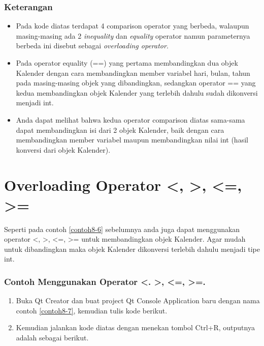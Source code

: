 \subsubsection*{Keterangan}

\begin{itemize}

\item
  Pada kode diatas terdapat 4 comparison operator yang berbeda, walaupun
  masing-masing ada 2 \emph{inequality} dan \emph{equality} operator
  namun parameternya berbeda ini disebut sebagai \emph{overloading
  operator}.
\item
  Pada operator equality (==) yang pertama membandingkan dua objek
  Kalender dengan cara membandingkan member variabel hari, bulan, tahun
  pada masing-masing objek yang dibandingkan, sedangkan operator == yang
  kedua membandingkan objek Kalender yang terlebih dahulu sudah
  dikonversi menjadi int.
\item
  Anda dapat melihat bahwa kedua operator comparison diatas sama-sama
  dapat membandingkan isi dari 2 objek Kalender, baik dengan cara
  membandingkan member variabel maupun membandingkan nilai int (hasil
  konversi dari objek Kalender).
\end{itemize}

\section{Overloading Operator \textless{}, \textgreater{}, \textless{}=, \textgreater{}=}\label{overloading-operator}

Seperti pada contoh \ref{contoh8-6} sebelumnya anda juga dapat menggunakan operator
\textless{}, \textgreater{}, \textless{}=, \textgreater{}= untuk
membandingkan objek Kalender. Agar mudah untuk dibandingkan maka objek
Kalender dikonversi terlebih dahulu menjadi tipe int.

\subsubsection*{Contoh  Menggunakan Operator \textless{}. \textgreater{}, \textless{}=, \textgreater{}=.}
\begin{enumerate}

\item
  Buka Qt Creator dan buat project Qt Console Application baru dengan
  nama contoh \ref{contoh8-7}, kemudian tulis kode berikut.




\item
  Kemudian jalankan kode diatas dengan menekan tombol Ctrl+R, outputnya
  adalah sebagai berikut.
\end{enumerate}

